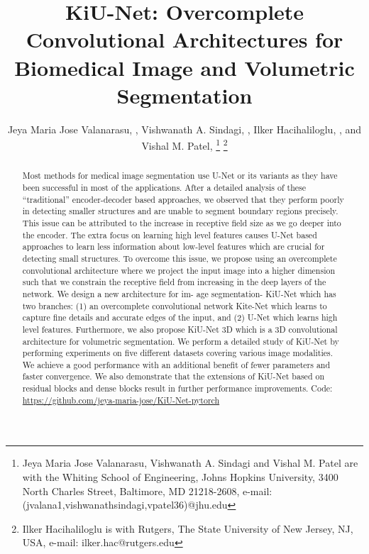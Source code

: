 \documentclass[journal,twoside,web]{ieeecolor}
\begin{document}
\title{KiU-Net: Overcomplete Convolutional Architectures for Biomedical Image and Volumetric Segmentation }
\author{Jeya Maria Jose Valanarasu, , Vishwanath A. Sindagi, , Ilker Hacihaliloglu, , and Vishal M. Patel, 
	\thanks{Jeya Maria Jose Valanarasu, Vishwanath A. Sindagi and Vishal M. Patel are with the Whiting School of Engineering, Johns Hopkins University, 3400 North Charles Street, Baltimore, MD 21218-2608, e-mail: (jvalana1,vishwanathsindagi,vpatel36)@jhu.edu
			\footnotesize}
		\thanks{ Ilker Hacihaliloglu is with Rutgers, The State University of New Jersey, NJ, USA, e-mail: ilker.hac@rutgers.edu
			\footnotesize}}




\maketitle


\begin{abstract}
Most methods for medical image segmentation use U-Net or its variants as they have been successful
in most of the applications. After a detailed analysis of
these “traditional” encoder-decoder based approaches, we
observed that they perform poorly in detecting smaller
structures and are unable to segment boundary regions
precisely. This issue can be attributed to the increase
in receptive field size as we go deeper into the encoder.
The extra focus on learning high level features causes 
U-Net based approaches to learn less information about
low-level features which are crucial for detecting small
structures. To overcome this issue, we propose using an
overcomplete convolutional architecture where we project
the input image into a higher dimension such that we
constrain the receptive field from increasing in the deep
layers of the network. We design a new architecture for im-
age segmentation- KiU-Net which has two branches: (1) an
overcomplete convolutional network Kite-Net which learns
to capture fine details and accurate edges of the input,
and (2) U-Net which learns high level features. Furthermore,
we also propose KiU-Net 3D which is a 3D convolutional
architecture for volumetric segmentation. We perform a
detailed study of KiU-Net by performing experiments on
five different datasets covering various image modalities. We achieve a good performance
with an additional
benefit of fewer parameters and faster convergence. We also demonstrate that the extensions of KiU-Net
based on residual blocks and dense blocks result in further
performance improvements. Code:  \href{https://github.com/jeya-maria-jose/KiU-Net-pytorch}{https://github.com/jeya-maria-jose/KiU-Net-pytorch}    
\end{abstract}
\end{document}
